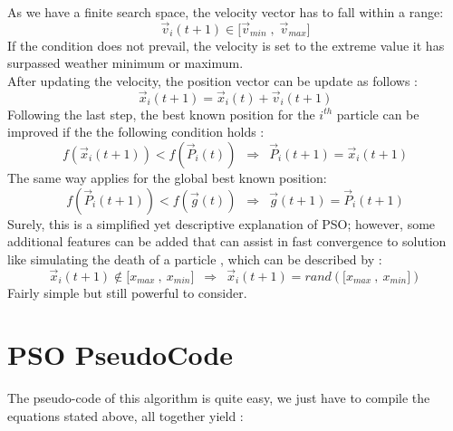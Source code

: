 As we have a finite search space, the velocity vector has to fall within
a range:\\
{\[{\overset{\rightarrow}{v}}_{i}(t + 1) \in \lbrack{\overset{\rightarrow}{v}}_{min}\;,\;{\overset{\rightarrow}{v}}_{max}\rbrack\]}If
the condition does not prevail, the velocity is set to the extreme value
it has surpassed weather minimum or maximum.\\
After updating the velocity, the position vector can be update as
follows :\\
{\[{\overset{\rightarrow}{x}}_{i}(t + 1) = {\overset{\rightarrow}{x}}_{i}(t) + {\overset{\rightarrow}{v}}_{i}(t + 1)\]}Following
the last step, the best known position for the {\(i^{th}\)} particle can
be improved if the the following condition holds :\\
{\[f({\overset{\rightarrow}{x}}_{i}(t + 1)) < f({\overset{\rightarrow}{P}}_{i}(t))\ \;\Longrightarrow\;\ {\overset{\rightarrow}{P}}_{i}(t + 1) = {\overset{\rightarrow}{x}}_{i}(t + 1)\]}The
same way applies for the global best known position:\\
{\[f({\overset{\rightarrow}{P}}_{i}(t + 1)) < f(\overset{\rightarrow}{g}(t))\ \;\Longrightarrow\;\ \overset{\rightarrow}{g}(t + 1) = {\overset{\rightarrow}{P}}_{i}(t + 1)\]}Surely,
this is a simplified yet descriptive explanation of PSO; however, some
additional features can be added that can assist in fast convergence to
solution like simulating the death of a particle , which can be
described by :\\
{\[{\overset{\rightarrow}{x}}_{i}(t + 1) \notin \lbrack x_{max}\ ,\ x_{min}\rbrack\ \;\Longrightarrow\;\ {\overset{\rightarrow}{x}}_{i}(t + 1) = rand(\lbrack x_{max}\ ,\ x_{min}\rbrack)\]}Fairly
simple but still powerful to consider.

\section{PSO PseudoCode}

The pseudo-code of this algorithm is quite easy, we just have to compile
the equations stated above, all together yield :


